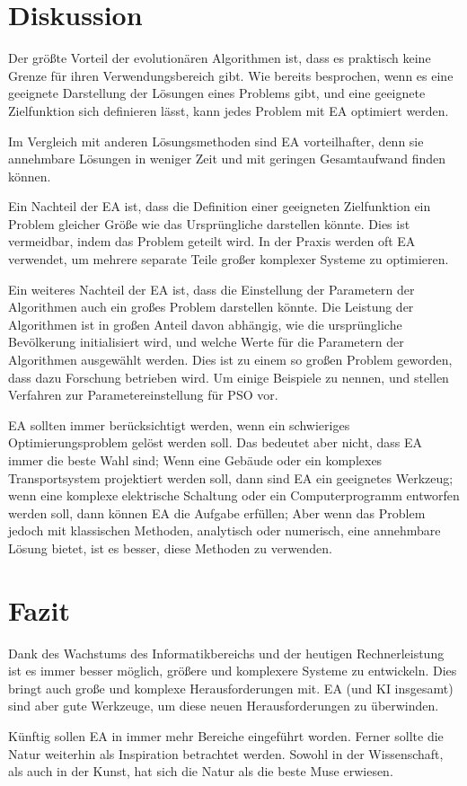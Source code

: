 \documentclass[twoside,twocolumn]{article}
\begin{document}
\section{Diskussion}
Der größte Vorteil der evolutionären Algorithmen ist, dass es praktisch keine Grenze für ihren Verwendungsbereich gibt. Wie bereits besprochen, wenn es eine geeignete Darstellung der Lösungen eines Problems gibt, und eine geeignete Zielfunktion sich definieren lässt, kann jedes Problem mit EA optimiert werden.\par
Im Vergleich mit anderen Lösungsmethoden sind EA vorteilhafter, denn sie annehmbare Lösungen in weniger Zeit und mit geringen Gesamtaufwand finden können.\par
Ein Nachteil der EA ist, dass die Definition einer geeigneten Zielfunktion ein Problem gleicher Größe wie das Ursprüngliche darstellen könnte. Dies ist vermeidbar, indem das Problem geteilt wird. In der Praxis werden oft EA verwendet, um mehrere separate Teile großer komplexer Systeme zu optimieren.\par
Ein weiteres Nachteil der EA ist, dass die Einstellung der Parametern der Algorithmen auch ein großes Problem darstellen könnte. Die Leistung der Algorithmen ist in großen Anteil davon abhängig, wie die ursprüngliche Bevölkerung initialisiert wird, und welche Werte für die Parametern der Algorithmen ausgewählt werden. Dies ist zu einem so großen Problem geworden, dass dazu Forschung betrieben wird. Um einige Beispiele zu nennen, \cite{pso_tuning_a} und \cite{pso_tuning_c} stellen Verfahren zur Parametereinstellung für PSO vor.\par
EA sollten immer berücksichtigt werden, wenn ein schwieriges Optimierungsproblem gelöst werden soll. Das bedeutet aber nicht, dass EA immer die beste Wahl sind; Wenn eine Gebäude oder ein komplexes Transportsystem projektiert werden soll, dann sind EA ein geeignetes Werkzeug; wenn eine komplexe elektrische Schaltung oder ein Computerprogramm entworfen werden soll, dann können EA die Aufgabe erfüllen; Aber wenn das Problem jedoch mit klassischen Methoden, analytisch oder numerisch, eine annehmbare Lösung bietet, ist es besser, diese Methoden zu verwenden.


\section{Fazit}
Dank des Wachstums des Informatikbereichs und der heutigen Rechnerleistung ist es immer besser möglich, größere und komplexere Systeme zu entwickeln. Dies bringt auch große und komplexe Herausforderungen mit. EA (und KI insgesamt) sind aber gute Werkzeuge, um diese neuen Herausforderungen zu überwinden.\par
Künftig sollen EA in immer mehr Bereiche eingeführt worden. Ferner sollte die Natur weiterhin als Inspiration betrachtet werden. Sowohl in der Wissenschaft, als auch in der Kunst, hat sich die Natur als die beste Muse erwiesen.
\end{document}
